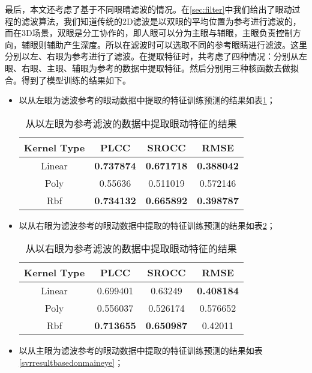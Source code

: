 最后，本文还考虑了基于不同眼睛滤波的情况。在\ref{sec:filter}中我们给出了眼动过程的滤波算法，我们知道传统的2D滤波是以双眼的平均位置为参考进行滤波的，而在3D场景，双眼是分工协作的，即人眼可以分为主眼与辅眼，主眼负责控制方向，辅眼则辅助产生深度。所以在滤波时可以选取不同的参考眼睛进行滤波。这里分别以左、右眼为参考进行了滤波。在提取特征时，共考虑了四种情况：分别从左眼、右眼、主眼、辅眼为参考的数据中提取特征。然后分别用三种核函数去做拟合。得到了模型训练的结果如下。
\begin{itemize}[noitemsep,topsep=0pt,parsep=0pt,partopsep=0pt]
\item 以从左眼为滤波参考的眼动数据中提取的特征训练预测的结果如表\ref{svrresultbasedonleft}；
\begin{table}[]
\centering
\caption{从以左眼为参考滤波的数据中提取眼动特征的结果}
\label{svrresultbasedonleft}
\begin{tabular}{@{}cccc@{}}
\toprule
Kernel Type & PLCC              & SROCC             & RMSE              \\ \midrule
Linear      & \textbf{0.737874} & \textbf{0.671718} & \textbf{0.388042} \\
Poly        & 0.55636           & 0.511019          & 0.572146          \\
Rbf         & \textbf{0.734132} & \textbf{0.665892} & \textbf{0.398787} \\ \bottomrule
\end{tabular}
\end{table}
\item 以从右眼为滤波参考的眼动数据中提取的特征训练预测的结果如表\ref{svrresultbasedonright}；
\begin{table}[]
\centering
\caption{从以右眼为参考滤波的数据中提取眼动特征的结果}
\label{svrresultbasedonright}
\begin{tabular}{@{}cccc@{}}
\toprule
Kernel Type & PLCC              & SROCC             & RMSE              \\ \midrule
Linear      & 0.699401          & 0.63249           & \textbf{0.408184} \\
Poly        & 0.556037          & 0.526174          & 0.576652          \\
Rbf         & \textbf{0.713655} & \textbf{0.650987} & 0.42011           \\ \bottomrule
\end{tabular}
\end{table}
\item 以从主眼为滤波参考的眼动数据中提取的特征训练预测的结果如表\ref{svrresultbasedonmaineye}；

\end{itemize}
